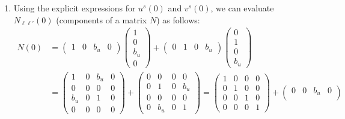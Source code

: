 \documentclass[10pt, a4paper]{article}
\begin{document}
\begin{enumerate}
\begin{align*}
    &=   \int \text{d}V_\mathbf{p} \ \left(|\kappa|^2 \ N_{\ell \ell'}(\mathbf{p}) e^{-i p \cdot (x - y)} \pm |\lambda|^2 \ M_{\ell \ell'}(\mathbf{p}) e^{+i p \cdot (x - y)}\right), \quad N_{\ell \ell'}(\mathbf{p}) = \sum_{s} u_l^s(\mathbf{p}) u_{l'}^{s\star}(\mathbf{p}), \ M_{\ell \ell'}(\mathbf{p}) = \sum_{s} v_l^s(\mathbf{p}) v_{l'}^{s\star}(\mathbf{p}).
  \end{align*}
  \item[(b)] Using the explicit expressions for $u^s(0)$ and $v^s(0)$, we can evaluate $N_{\ell \ell'} (0)$ (components of a matrix $N$) as follows: 
  \begin{align*}
    N(0) &= \begin{pmatrix}
      1& 0& b_u& 0
    \end{pmatrix} \begin{pmatrix}
      1\\ 0\\ b_u\\ 0
    \end{pmatrix}  + 
    \begin{pmatrix}
      0& 1& 0& b_u
    \end{pmatrix} \begin{pmatrix}
      0\\ 1\\ 0\\ b_u
    \end{pmatrix}\\
    &= 
    \begin{pmatrix}
      1 & 0 & b_u & 0\\
      0 & 0 & 0 & 0\\
      b_u & 0 & 1 & 0\\
      0 & 0 & 0 & 0
    \end{pmatrix}
    + \begin{pmatrix}
      0 & 0 & 0 & 0\\
      0 & 1 & 0 & b_u\\
      0 & 0 & 0 & 0\\
      0 & b_u & 0 & 1
    \end{pmatrix}= 
    \begin{pmatrix}
      1 & 0 & 0 & 0\\
      0 & 1 & 0 & 0\\
      0 & 0 & 1 & 0\\
      0 & 0 & 0 & 1
    \end{pmatrix}
    + \begin{pmatrix}
      0 & 0 & b_u & 0\\

\end{pmatrix}
\end{align*}
\end{enumerate}
\end{document}
